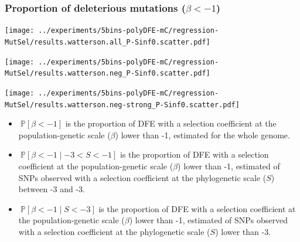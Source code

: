 \documentclass{article}
\newcommand{\proba}{\mathbb{P}}
\newcommand{\Sphy}{S}
\newcommand{\divStrongDel}{\Sphy < -3}
\newcommand{\divDel}{-3 < \Sphy < -1}
\newcommand{\given}{\mid}
\newcommand{\Spop}{\beta}
\newcommand{\polyDel}{\Spop < -1}
\begin{document}
    \subsubsection{Proportion of deleterious mutations ($\polyDel$)}\label{subsec:proportion-deleterious-mutations}
    \begin{minipage}{0.32\linewidth}
        \texttt{[image: ../experiments/5bins-polyDFE-mC/regression-MutSel/results.watterson.all\_P-Sinf0.scatter.pdf]}
    \end{minipage}
    \begin{minipage}{0.32\linewidth}
        \texttt{[image: ../experiments/5bins-polyDFE-mC/regression-MutSel/results.watterson.neg\_P-Sinf0.scatter.pdf]}
    \end{minipage}
    \begin{minipage}{0.32\linewidth}
        \texttt{[image: ../experiments/5bins-polyDFE-mC/regression-MutSel/results.watterson.neg-strong\_P-Sinf0.scatter.pdf]}
    \end{minipage}
    \begin{itemize}
        \item $\ \proba [ \polyDel ]$ is the proportion of DFE with a selection coefficient at the population-genetic scale ($\Spop$) lower than -1, estimated for the whole genome.
        \item $\ \proba [ \polyDel \given \divDel]$ is the proportion of DFE with a selection coefficient at the population-genetic scale ($\Spop$) lower than -1, estimated of SNPs observed with a selection coefficient at the phylogenetic scale ($\Sphy$) between -3 and -3.
        \item $\ \proba [ \polyDel \given \divStrongDel ]$ is the proportion of DFE with a selection coefficient at the population-genetic scale ($\Spop$) lower than -1, estimated of SNPs observed with a selection coefficient at the phylogenetic scale ($\Sphy$) lower than -3.
    \end{itemize}
\end{document}
